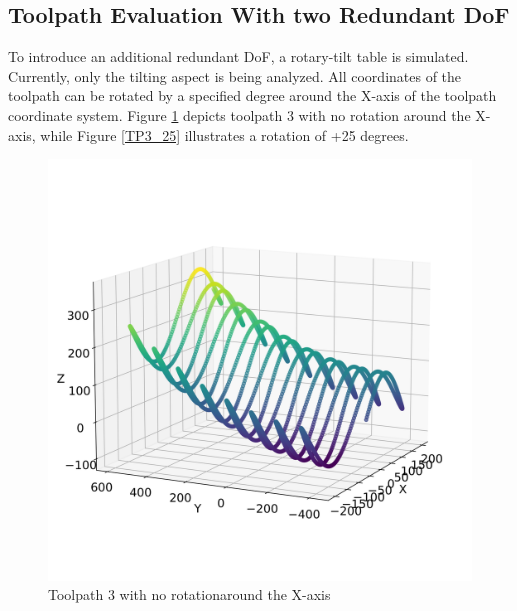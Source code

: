 \newpage

\subsection{Toolpath Evaluation With two Redundant DoF}\label{2RDOF}

To introduce an additional redundant \acrshort{DoF}, a rotary-tilt table is simulated. Currently, only the tilting aspect is being analyzed. All coordinates of the toolpath can be rotated by a specified degree around the X-axis of the toolpath coordinate system. Figure \ref{TP3_0} depicts toolpath 3 with no rotation around the X-axis, while Figure \ref{TP3_25} illustrates a rotation of +25 degrees.

\begin{figure}[H]%
	\centering
	\begin{minipage}{0.5\textwidth}
		\includegraphics[width=\textwidth]{figures/path3_kipp_0_comparison.png}
		\caption{Toolpath 3 with no rotation\newline around the X-axis}
		\label{TP3_0}
	\end{minipage}\hfill
	\begin{minipage}{0.5\textwidth}

\end{minipage}
\end{figure}
